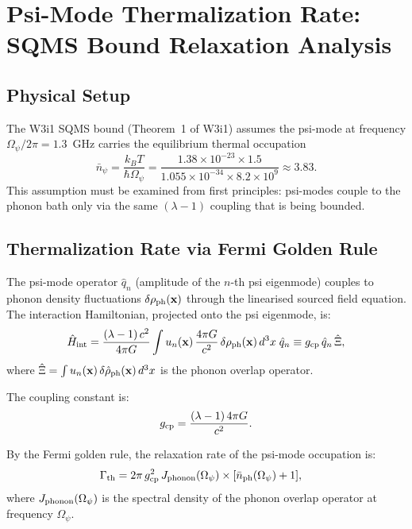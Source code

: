\documentclass[11pt,twocolumn]{article}
\newcommand{\lam}{\lambda}
\newcommand{\Opsi}{\Omega_\psi}
\newcommand{\Gammath}{\Gamma_{\rm th}}
\newcommand{\nbar}{\bar{n}}
\begin{document}
\section{Psi-Mode Thermalization Rate: SQMS Bound Relaxation Analysis}
\label{sec:thermalization}

\subsection{Physical Setup}

The W3i1 SQMS bound (Theorem~1 of W3i1) assumes the psi-mode at frequency
$\Opsi/2\pi = 1.3$~GHz carries the equilibrium thermal occupation
\begin{equation}
\nbar_\psi = \frac{k_B T}{\hbar\Opsi}
= \frac{1.38\times10^{-23}\times1.5}{1.055\times10^{-34}\times8.2\times10^9}
\approx 3.83.
\label{eq:nbar_equilibrium}
\end{equation}
This assumption must be examined from first principles: psi-modes couple to
the phonon bath only via the same $(\lam-1)$ coupling that is being bounded.

\subsection{Thermalization Rate via Fermi Golden Rule}

The psi-mode operator $\hat{q}_n$ (amplitude of the $n$-th psi eigenmode)
couples to phonon density fluctuations $\delta\rho_{\rm ph}(\mathbf{x})$
through the linearised sourced field equation. The interaction Hamiltonian,
projected onto the psi eigenmode, is:
\begin{equation}
\hat{H}_{\rm int} = \frac{(\lam-1)\,c^2}{4\pi G}
\int u_n(\mathbf{x})\,
\frac{4\pi G}{c^2}\,\delta\rho_{\rm ph}(\mathbf{x})\,d^3x\;\hat{q}_n
\equiv g_{\rm cp}\,\hat{q}_n\,\hat{\Xi},
\label{eq:H_int}
\end{equation}
where $\hat{\Xi} = \int u_n(\mathbf{x})\,\delta\hat{\rho}_{\rm ph}(\mathbf{x})\,d^3x$
is the phonon overlap operator.

The coupling constant is:
\begin{equation}
g_{\rm cp} = \frac{(\lam-1)\,4\pi G}{c^2}.
\label{eq:gcp}
\end{equation}

By the Fermi golden rule, the relaxation rate of the psi-mode occupation is:
\begin{align}
\Gammath &= 2\pi\,g_{\rm cp}^2\,J_{\rm phonon}(\Opsi)
\times[\nbar_{\rm ph}(\Opsi) + 1],
\label{eq:Gammuth_fgr}
\end{align}
where $J_{\rm phonon}(\Opsi)$ is the spectral density of the phonon
overlap operator at frequency $\Opsi$.
\end{document}
